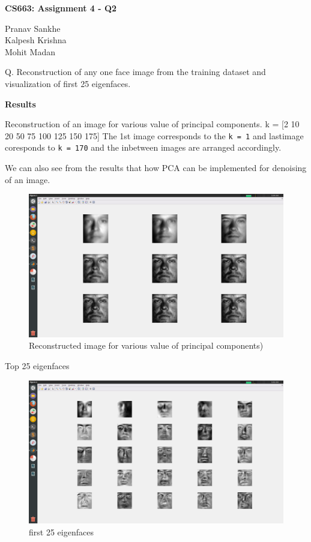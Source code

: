 \documentclass{article}
\begin{document}
{\textbf{CS663: Assignment 4 - Q2}}
\vskip 0.2in

Pranav Sankhe \\ Kalpesh Krishna \\ Mohit Madan 

\vskip 0.5in
Q. Reconstruction of any one face image from the training dataset and visualization of first 25 eigenfaces. 

\vskip 0.2in

\textbf{Results}

\vskip 0.5in
Reconstruction of an image for various value of principal components. 
k = [2 10 20 50 75 100 125 150 175] 
The 1st image corresponds to the \texttt{k = 1} and lastimage coresponds to \texttt{k = 170} and the inbetween images are arranged accordingly. 

We can also see from the results that how PCA can be implemented for denoising of an image.

\begin{figure}[h!]
  \includegraphics[width=\linewidth]{recon.png}
  \caption{Reconstructed image for various value of principal components)}
  \label{fig:result1}
\end{figure}
\newpage
Top 25 eigenfaces
\begin{figure}[h!]
  \includegraphics[width=\linewidth]{first_25.png}
  \caption{first 25 eigenfaces}
  \label{fig:result2}
\end{figure}
\end{document}
